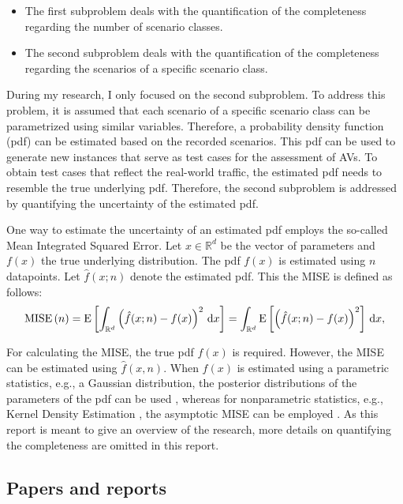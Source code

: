 \begin{itemize}
	\item The first subproblem deals with the quantification of the completeness regarding the number of scenario classes. 
	\item The second subproblem deals with the quantification of the completeness regarding the scenarios of a specific scenario class.
\end{itemize}

During my research, I only focused on the second subproblem. To address this problem, it is assumed that each scenario of a specific scenario class can be parametrized using similar variables. Therefore, a probability density function (pdf) can be estimated based on the recorded scenarios. This pdf can be used to generate new instances that serve as test cases for the assessment of AVs. To obtain test cases that reflect the real-world traffic, the estimated pdf needs to resemble the true underlying pdf. Therefore, the second subproblem is addressed by quantifying the uncertainty of the estimated pdf.

One way to estimate the uncertainty of an estimated pdf employs the so-called Mean Integrated Squared Error. Let $x \in \mathbb{R}^d$ be the vector of parameters and $f(x)$ the true underlying distribution. The pdf $f(x)$ is estimated using $n$ datapoints. Let $\hat{f}(x;n)$ denote the estimated pdf. This the MISE is defined as follows:
\begin{equation} \label{eq:mise}
	\textup{MISE} \left( n \right) = \textup{E} \left[  \int_{\mathbb{R}^d} \left(\hat{f}(x;n) - f(x)\right)^2 \, \textup{d}x \right] = \int_{\mathbb{R}^d} \textup{E} \left[ \left(\hat{f}(x;n) - f(x)\right)^2 \right] \, \textup{d}x,
\end{equation}

For calculating the MISE, the true pdf $f(x)$ is required. However, the MISE can be estimated using $\hat{f}(x, n)$. When $f(x)$ is estimated using a parametric statistics, e.g., a Gaussian distribution, the posterior distributions of the parameters of the pdf can be used \cite{bishop2006pattern}, whereas for nonparametric statistics, e.g., Kernel Density Estimation \cite{rosenblatt1956remarks, parzen1962estimation}, the asymptotic MISE can be employed \cite{chen2017tutorial}. As this report is meant to give an overview of the research, more details on quantifying the completeness are omitted in this report.

\subsection{Papers and reports}
\label{sec:paper}

